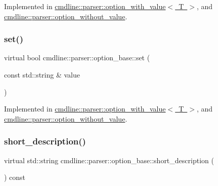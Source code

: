 Implemented in \mbox{\hyperlink{classcmdline_1_1parser_1_1option__with__value_a6bdd4adfe3afff3fe0d0c57d2259a969}{cmdline\+::parser\+::option\+\_\+with\+\_\+value$<$ T $>$}}, and \mbox{\hyperlink{classcmdline_1_1parser_1_1option__without__value_a14d3ef6f444aefebda41669d21b24008}{cmdline\+::parser\+::option\+\_\+without\+\_\+value}}.

\mbox{\label{classcmdline_1_1parser_1_1option__base_a60444de6a257a3cca44a7a687a1d16fd}} 
\subsubsection{\texorpdfstring{set()}{set()}\hspace{0.1cm}{\footnotesize\ttfamily [2/2]}}
{\footnotesize\ttfamily virtual bool cmdline\+::parser\+::option\+\_\+base\+::set (\begin{DoxyParamCaption}\item[{const std\+::string \&}]{value }\end{DoxyParamCaption})\hspace{0.3cm}{\ttfamily [pure virtual]}}



Implemented in \mbox{\hyperlink{classcmdline_1_1parser_1_1option__with__value_a295815e19351f027fdbdcf00d46187d1}{cmdline\+::parser\+::option\+\_\+with\+\_\+value$<$ T $>$}}, and \mbox{\hyperlink{classcmdline_1_1parser_1_1option__without__value_ad8e93b69a9adb63f65a793d2c8099aae}{cmdline\+::parser\+::option\+\_\+without\+\_\+value}}.

\mbox{\label{classcmdline_1_1parser_1_1option__base_a091cab2d9f8e85a8e5e1a1a11e274aff}} 
\subsubsection{\texorpdfstring{short\_description()}{short\_description()}}
{\footnotesize\ttfamily virtual std\+::string cmdline\+::parser\+::option\+\_\+base\+::short\+\_\+description (\begin{DoxyParamCaption}{ }\end{DoxyParamCaption}) const\hspace{0.3cm}{\ttfamily [pure virtual]}}



